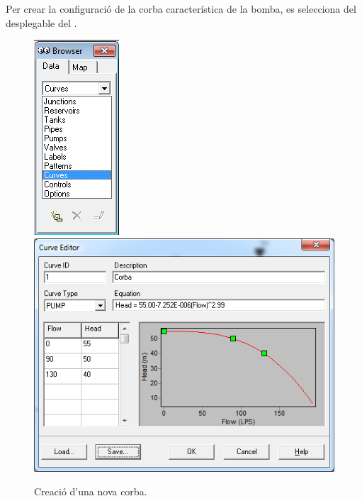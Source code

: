 \documentclass[12pt]{article}
\begin{document}
\pagebreak
Per crear la configuració de la corba característica de la bomba, es selecciona  del desplegable del .
\begin{figure}[h!]
	\centering
	\includegraphics[scale=0.6]{imatges/epanet/10.png}
	\includegraphics[scale=0.4]{imatges/epanet/11.png}
	\caption{Creació d'una nova corba.}
\end{figure}

\clearpage
\end{document}

